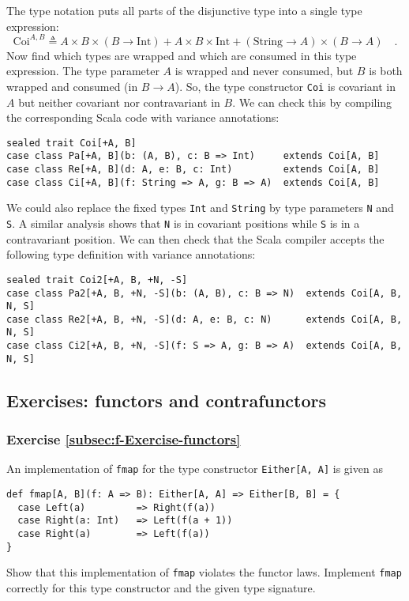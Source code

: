 The type notation puts all parts of the disjunctive type into a single
type expression:
\[
\text{Coi}^{A,B}\triangleq A\times B\times(B\rightarrow\text{Int})+A\times B\times\text{Int}+(\text{String}\rightarrow A)\times(B\rightarrow A)\quad.
\]
Now find which types are wrapped and which are consumed in this type
expression. The type parameter $A$ is wrapped and never consumed,
but $B$ is both wrapped and consumed (in $B\rightarrow A$). So,
the type constructor \lstinline!Coi! is covariant in $A$ but neither
covariant nor contravariant in $B$. We can check this by compiling
the corresponding Scala code with variance annotations:
\begin{lstlisting}
sealed trait Coi[+A, B]
case class Pa[+A, B](b: (A, B), c: B => Int)     extends Coi[A, B]
case class Re[+A, B](d: A, e: B, c: Int)         extends Coi[A, B]
case class Ci[+A, B](f: String => A, g: B => A)  extends Coi[A, B]
\end{lstlisting}
We could also replace the fixed types \lstinline!Int! and \lstinline!String!
by type parameters \lstinline!N! and \lstinline!S!. A similar analysis
shows that \lstinline!N! is in covariant positions while \lstinline!S!
is in a contravariant position. We can then check that the Scala compiler
accepts the following type definition with variance annotations:
\begin{lstlisting}
sealed trait Coi2[+A, B, +N, -S]
case class Pa2[+A, B, +N, -S](b: (A, B), c: B => N)  extends Coi[A, B, N, S]
case class Re2[+A, B, +N, -S](d: A, e: B, c: N)      extends Coi[A, B, N, S]
case class Ci2[+A, B, +N, -S](f: S => A, g: B => A)  extends Coi[A, B, N, S]
\end{lstlisting}


\subsection{Exercises: functors and contrafunctors}

\subsubsection{Exercise \label{subsec:f-Exercise-functors}\ref{subsec:f-Exercise-functors}}

An implementation of \lstinline!fmap! for the type constructor \lstinline!Either[A, A]!
is given as
\begin{lstlisting}
def fmap[A, B](f: A => B): Either[A, A] => Either[B, B] = {
  case Left(a)         => Right(f(a))
  case Right(a: Int)   => Left(f(a + 1))
  case Right(a)        => Left(f(a))
}
\end{lstlisting}
Show that this implementation of \lstinline!fmap! violates the functor
laws. Implement \lstinline!fmap! correctly for this type constructor
and the given type signature.

